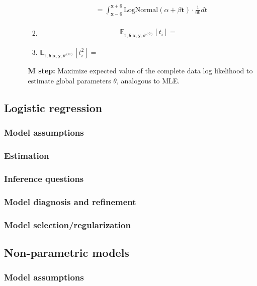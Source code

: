 \documentclass{article}
\begin{document}
\begin{itemize}
\begin{enumerate}[label=(\alph*)]
\begin{enumerate}[label=(\arabic*)]
\begin{align*}
            &=  \int_{\mathbf{x} - 6}^{\mathbf{x} + 6}\text{LogNormal}(\alpha + \beta \mathbf{t}) \cdot \frac{1}{60} d\mathbf{t} \\
          \end{align*}
        \item
          \begin{align*}
            \mathbb{E}_{\mathbf{t}, \mathbf{\delta} | \mathbf{x}, \mathbf{y}, \theta^{(0)}}[t_i] =
          \end{align*}
        \item $\mathbb{E}_{\mathbf{t}, \mathbf{\delta} | \mathbf{x}, \mathbf{y}, \theta^{(0)}}[t_i^2] =$
      \end{enumerate}

      \textbf{M step:} Maximize expected value of the complete data log likelihood to estimate global parameters $\theta$, analogous to MLE.
  \end{enumerate}
\end{itemize}

\subsection{Logistic regression}
\subsubsection{Model assumptions}
\subsubsection{Estimation}
\subsubsection{Inference questions}
\subsubsection{Model diagnosis and refinement}
\subsubsection{Model selection/regularization}

\subsection{Non-parametric models}
\subsubsection{Model assumptions}
\end{document}
